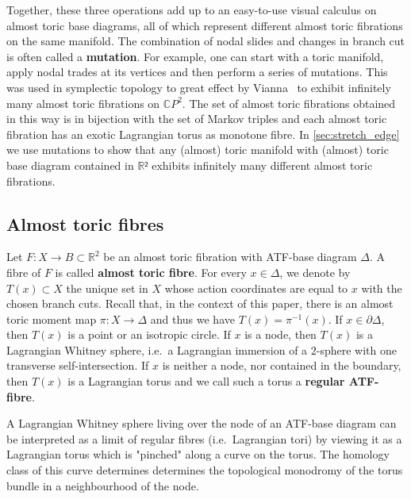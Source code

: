 \documentclass[12pt,a4paper,draft]{scrartcl}
\begin{document}
Together, these three operations add up to an easy-to-use visual calculus on almost toric base diagrams, all of which represent different almost toric fibrations on the same manifold.
The combination of nodal slides and changes in branch cut is often called a \textbf{mutation}.
For example, one can start with a toric manifold, apply nodal trades at its vertices and then perform a series of mutations.
This was used in symplectic topology to great effect by Vianna~\cite{Via16} to exhibit infinitely many almost toric fibrations on $\mathbb{C}P^2$.
The set of almost toric fibrations obtained in this way is in bijection with the set of Markov triples and each almost toric fibration has an exotic Lagrangian torus as monotone fibre.
In \cref{sec:stretch_edge} we use mutations to show that any (almost) toric manifold with (almost) toric base diagram contained in $ℝ²$ exhibits infinitely many different almost toric fibrations.

\subsection{Almost toric fibres}
\label{sec:atfibres}

Let $F \colon X \rightarrow B \subset \mathbb{R}^2$ be an almost toric fibration with ATF-base diagram $\Delta$.
A fibre of $F$ is called \textbf{almost toric fibre}.
For every $x \in \Delta$, we denote by $T(x) \subset X$ the unique set in $X$ whose action coordinates are equal to $x$ with the chosen branch cuts.
Recall that, in the context of this paper, there is an almost toric moment map $\pi \colon X \rightarrow \Delta$ and thus we have $T(x) = \pi^{-1}(x)$.
If $x \in \partial \Delta$, then $T(x)$ is a point or an isotropic circle.
If $x$ is a node, then $T(x)$ is a Lagrangian Whitney sphere, i.e.\ a Lagrangian immersion of a $2$-sphere with one transverse self-intersection.
If $x$ is neither a node, nor contained in the boundary, then $T(x)$ is a Lagrangian torus and we call such a torus a \textbf{regular ATF-fibre}.

\begin{remark}
    \label{rk:pinchedtorus}
    A Lagrangian Whitney sphere living over the node of an ATF-base diagram can be interpreted as a limit of regular fibres (i.e.\ Lagrangian tori) by viewing it as a Lagrangian torus which is "pinched" along a curve on the torus.
The homology class of this curve determines determines the topological monodromy of the torus bundle in a neighbourhood of the node.
\end{remark}
\end{document}
